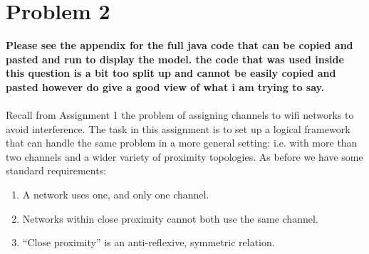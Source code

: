 \documentclass{article}
\begin{document}
\section{Problem 2}
\textbf{Please see the appendix for the full java code that can be copied and pasted and run to display the model. the code that was used inside this question is a bit too split up and cannot be easily copied and pasted however do give a good view of what i am trying to say.}\\\\
Recall from Assignment 1 the problem of assigning channels to wifi networks to avoid interference. The
task in this assignment is to set up a logical framework that can handle the same problem in a more
general setting: i.e. with more than two channels and a wider variety of proximity topologies. As before we have some standard requirements:
    \begin{enumerate}[I]
        \item A network uses one, and only one channel.
        \item Networks within close proximity cannot both use the same channel.
        \item “Close proximity” is an anti-reflexive, symmetric relation.
    \end{enumerate}
\end{document}
